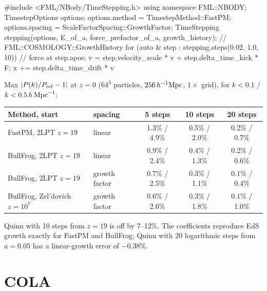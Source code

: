 \begin{cppcode}
#include <FML/NBody/TimeStepping.h>
using namespace FML::NBODY;
TimestepOptions options;
options.method  = TimestepMethod::FastPM;
options.spacing = ScaleFactorSpacing::GrowthFactor;
TimeStepping stepping(options, E_of_a, force_prefactor_of_a, growth_history);   // FML::COSMOLOGY::GrowthHistory
for (auto & step : stepping.steps(0.02, 1.0, 10)) {
    // force at step.apos; v = step.velocity_scale * v + step.delta_time_kick * F; x += step.delta_time_drift * v
}
\end{cppcode}

\begin{validation}
Max $|P(k)/P_{\rm ref}-1|$ at $z=0$ ($64^3$ particles, $256\,h^{-1}\mathrm{Mpc}$, $1\times$ grid), for $k<0.1$ / $k<0.5\,h\,\mathrm{Mpc}^{-1}$:
\begin{center}\small
\begin{tabular}{@{}llccc@{}}
\toprule
Method, start & spacing & 5 steps & 10 steps & 20 steps \\
\midrule
FastPM, 2LPT $z=19$ & linear & 1.3\% / 4.9\% & 0.5\% / 2.0\% & 0.2\% / 0.7\% \\
BullFrog, 2LPT $z=19$ & linear & 0.9\% / 2.4\% & 0.4\% / 1.3\% & 0.2\% / 0.6\% \\
BullFrog, 2LPT $z=19$ & growth factor & 0.7\% / 2.5\% & 0.3\% / 1.1\% & 0.1\% / 0.4\% \\
BullFrog, Zel'dovich $z=10^7$ & growth factor & 0.6\% / 2.6\% & 0.3\% / 1.8\% & 0.1\% / 1.0\% \\
\bottomrule
\end{tabular}
\end{center}
Quinn with 10 steps from $z=19$ is off by 7--12\%. The coefficients reproduce EdS growth exactly for FastPM and
BullFrog; Quinn with 20 logarithmic steps from $a=0.05$ has a linear-growth error of $-0.38\%$.
\end{validation}

\section{COLA}\label{sec:nbody-cola}

